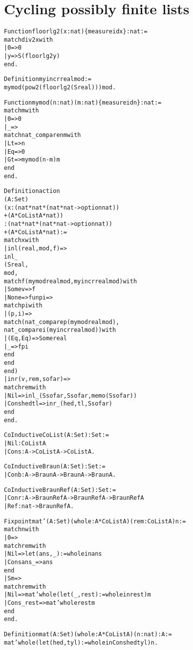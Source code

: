 \documentclass{llncs}
\begin{document}
\section{Cycling possibly finite lists}

\begin{alltt}

Function floorlg2 (x:nat) \{measure id x\} :nat :=
  match div2 x with
    | 0 => 0
    | y => S (floorlg2 y)
  end.

Definition myincr real mod := 
  mymod (pow 2 (floorlg2 (S real))) mod.

Function mymod (n:nat) (m:nat) \{measure id n\} : nat :=
  match m with
    | 0 => 0
    | _ =>
      match nat_compare n m with
        | Lt => n
        | Eq => 0
        | Gt => mymod (n-m) m
      end
  end.

Definition action 
  (A:Set) 
  (x:(nat*nat*(nat*nat->option nat))
    +(A * CoList A * nat))
  : (nat*nat*(nat*nat->option nat))
    +(A * CoList A * nat) :=
  match x with
    | inl (real,mod,f) => 
      inl _ 
      (S real,
       mod,
       match f (mymod real mod,myincr real mod) with
         | Some v => f
         | None => fun pi =>
           match pi with
             | (p,i) => 
               match (nat_compare p (mymod real mod),
                 nat_compare i (myincr real mod)) with
                 | (Eq,Eq) => Some real
                 | _ =>  f pi
               end
           end
       end)
    | inr (v,rem,sofar) =>
      match rem with
        | Nil => inl _ (S sofar,S sofar,memo (S sofar))
        | Cons hed tl => inr _ (hed,tl,S sofar)
      end
  end.

CoInductive CoList (A:Set) : Set :=
| Nil : CoList A
| Cons : A -> CoList A -> CoList A.

CoInductive Braun (A:Set) : Set :=
| Conb : A -> Braun A -> Braun A -> Braun A.

CoInductive BraunRef (A:Set) : Set :=
| Conr : A -> BraunRef A -> BraunRef A -> BraunRef A
| Ref : nat -> BraunRef A.

Fixpoint mat' (A:Set) (whole:A * CoList A) (rem:CoList A) n :=
  match n with
    | 0 => 
      match rem with
        | Nil => let (ans,_) := whole in ans
        | Cons ans _ => ans
      end
    | S m =>
      match rem with
        | Nil => mat' whole (let (_,rest) := whole in rest) m
        | Cons _ rest => mat' whole rest m
      end
  end.

Definition mat (A:Set) (whole:A * CoList A) (n:nat) : A :=
  mat' whole (let (hed,tyl) := whole in Cons hed tyl) n.


\end{alltt}
\end{document}
